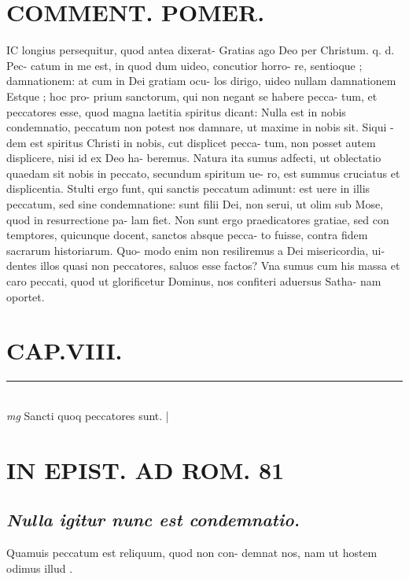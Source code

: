 \documentclass{article}
\begin{document}
\begin{pages}
\section*{COMMENT. POMER.  }\pstart IC longius persequitur, quod antea dixerat- Gratias ago Deo per Christum. q. d. Pec- catum in me est, in quod dum uideo, concutior horro- re, sentioque ; damnationem: at cum in Dei gratiam ocu- los dirigo, uideo nullam damnationem Estque ; hoc pro- prium sanctorum, qui non negant se habere pecca- tum, et peccatores esse, quod magna laetitia spiritus dicant: Nulla est in nobis condemnatio, peccatum non potest nos damnare, ut maxime in nobis sit. Siqui - dem est spiritus Christi in nobis, cut displicet pecca- tum, non posset autem displicere, nisi id ex Deo ha- beremus. Natura ita sumus adfecti, ut oblectatio quaedam sit nobis in peccato, secundum spiritum ue- ro, est summus cruciatus et displicentia. Stulti ergo funt, qui sanctis peccatum adimunt: est uere in illis peccatum, sed sine condemnatione: sunt filii Dei, non serui, ut olim sub Mose, quod in resurrectione pa- lam fiet. Non sunt ergo praedicatores gratiae, sed con temptores, quicunque docent, sanctos absque pecca- to fuisse, contra fidem sacrarum historiarum. Quo- modo enim non resiliremus a Dei misericordia, ui- dentes illos quasi non peccatores, saluos esse factos? Vna sumus cum his massa et caro peccati, quod ut glorificetur Dominus, nos confiteri aduersus Satha- nam oportet.   \pend
\endnumbering\beginnumbering\section{CAP.VIII.}
\vspace{0.5cm}\noindent
\vspace{0.2cm}\rule{1cm}{0.2pt}\\ 
\hspace{0.2cm}\textit{mg}
\footnotesize Sancti quoq peccatores sunt. 
\normalsize| 
\section*{IN EPIST. AD ROM.  81 }
\marginpar{[ p.]}
{}
\subsection*{\textit{Nulla igitur nunc est condemnatio. }}\pstart Quamuis peccatum est reliquum, quod non con- demnat nos, nam ut hostem odimus illud .   \pend
{}
{}

\end{pages}
\end{document}
